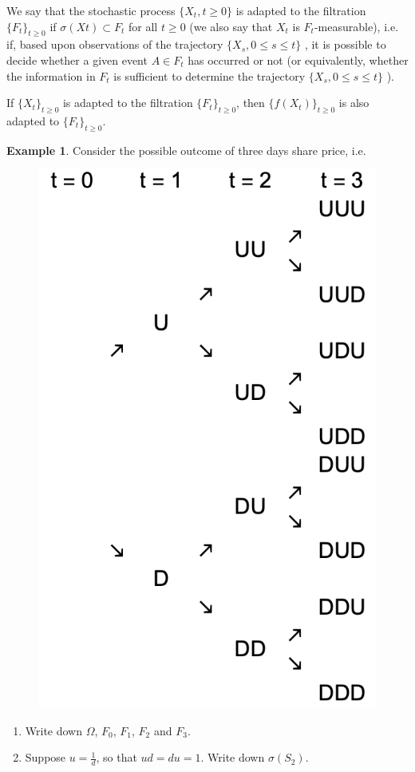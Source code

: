 \documentclass[11pt,a4paper]{book}
\theoremstyle{definition}\newtheorem{definition}{Definition}
\theoremstyle{definition}\newtheorem{fact}{Fact}
\theoremstyle{definition}\newtheorem{remark}{Remark}
\theoremstyle{definition}\newtheorem{ex}{Ex.}
\theoremstyle{definition}\newtheorem{project}{Project}
\theoremstyle{definition}\newtheorem{problem}{Problem}
\theoremstyle{definition}\newtheorem{example}{Example}
\numberwithin{theorem}{section}
\numberwithin{corollary}{chapter}
\numberwithin{assumption}{chapter}
\numberwithin{definition}{chapter}
\numberwithin{prop}{chapter}
\numberwithin{notation}{chapter}
\numberwithin{problem}{chapter}
\numberwithin{example}{chapter}
\numberwithin{fact}{chapter}
\numberwithin{ex}{chapter}
\begin{document}
We say that the stochastic process $\{X_t, t \geq 0\}$ is adapted to the filtration  $\{F_t\}_{t \geq 0}$ if $\sigma(Xt) \subset F_t$ for all $t \geq 0$ (we also say that $X_t$ is $F_t$-measurable), i.e. if, based upon observations of the trajectory $\{X_s, 0 \leq s \leq t\}$ , it is possible to decide whether a given event $A \in F_t$ has occurred or not (or equivalently, whether the information in $F_t$ is sufficient to determine the trajectory $\{X_s, 0 \leq s \leq t\}$ ).

If $\{X_t\}_{t \geq 0}$ is adapted to the filtration $\{F_t\}_{t \geq 0}$, then $\{f(X_t)\}_{t \geq 0}$ is also adapted to $\{F_t\}_{t \geq 0}$.

\begin{example}
Consider the possible outcome of three days share price, i.e.
\begin{figure}[H]
	\centering
	\includegraphics[scale=0.4]{Chapter01/Chapter1_8.png}
\end{figure}
\begin{enumerate}[label=(\alph*)]
\item Write down $\Omega$, $F_0$, $F_1$, $F_2$ and $F_3$.
\item Suppose $u=\frac{1}{d}$, so that $ud = du = 1$. Write down $\sigma(S_2)$.
\end{enumerate}
\end{example}
\end{document}
